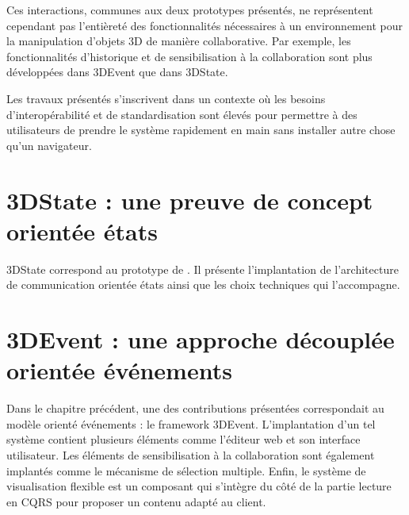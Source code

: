 Ces interactions, communes aux deux prototypes présentés, ne 
représentent cependant pas l'entièreté des fonctionnalités nécessaires à un 
environnement pour la manipulation d'objets 3D de manière 
collaborative. Par exemple, les fonctionnalités d'historique et de sensibilisation à 
la collaboration sont plus développées dans 3DEvent que dans 3DState.


Les travaux présentés s'inscrivent dans un contexte où les besoins 
d'interopérabilité et de standardisation sont élevés pour permettre à des 
utilisateurs de prendre le système rapidement en main sans installer autre chose 
qu'un navigateur.
\section{3DState : une preuve de concept orientée états}
\label{sec:3DState}
3DState correspond au prototype de 
\cite{Desprat2015a,Desprat2015b}. Il présente l'implantation de l'architecture de 
communication orientée états ainsi que les choix techniques qui l'accompagne.







\section{3DEvent : une approche découplée orientée événements}
\label{sec:3DEvent}
Dans le chapitre précédent, une des contributions présentées correspondait au 
modèle orienté événements : le \gls{framework} 3DEvent. 
L'implantation d'un tel système contient plusieurs éléments comme l'éditeur 
web et son interface utilisateur. Les éléments de sensibilisation à la collaboration 
sont également implantés comme le mécanisme de sélection multiple. Enfin, le 
système de visualisation flexible est un composant qui s'intègre du côté de la 
partie lecture en \gls{CQRS} pour proposer un contenu adapté au client. 







